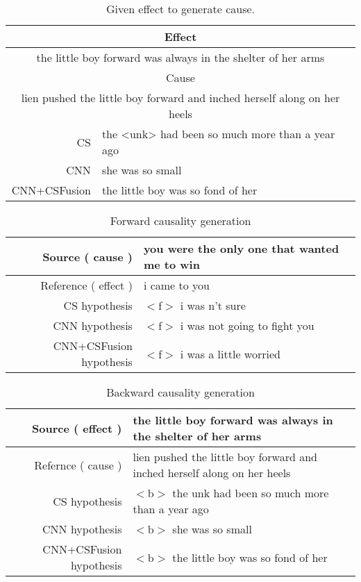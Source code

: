 {\begin{table*}[th]
    \centering
    \small
    \begin{tabular}{|r|l|}%
    \hline
    \multicolumn{2}{|c|}{Effect}\\ 
    \hline
    \multicolumn{2}{|c|}{the little boy forward was always in the shelter of her arms}\\ 
    \hline
    \multicolumn{2}{|c|}{Cause} \\
    \hline
    \multicolumn{2}{|c|}{lien pushed the little boy forward and inched herself along on her heels}\\ 
    \hline
    CS & the <unk> had been so much more than a year ago \\
    \hline
    CNN & she was so small \\
    \hline
    CNN+CSFusion & the little boy was so fond of her \\
    \hline
    \end{tabular}
    \caption{Given effect to generate cause.}
    \label{tab:effect_exp}
\end{table*}
}%

\begin{table*}[th]
    \centering
    \small
    \begin{tabular}{|r|l|}%
    \hline
    Source ( cause ) & you were the only one that wanted me to win \\ 
    \hline
    Reference ( effect ) & i came to you \\ 
    \hline
    CS hypothesis & $<$f$>$ i was n't sure \\
    \hline
    CNN hypothesis & $<$f$>$ i was not going to fight you \\
    \hline
    CNN+CSFusion hypothesis & $<$f$>$ i was a little worried \\
    \hline
    \end{tabular}
    \caption{Forward causality generation}
    \label{tab:cause_exp}
\end{table*}

\begin{table*}[th]
    \centering
    \small
    \begin{tabular}{|r|l|}%
    \hline
    Source ( effect ) & the little boy forward was always in the shelter of her arms \\ 
    \hline
    Refernce ( cause ) & lien pushed the little boy forward and inched herself along on her heels \\ 
    \hline
    CS hypothesis & $<$b$>$ the unk had been so much more than a year ago \\
    \hline
    CNN hypothesis & $<$b$>$ she was so small \\
    \hline
    CNN+CSFusion hypothesis & $<$b$>$ the little boy was so fond of her \\
    \hline
    \end{tabular}
    \caption{Backward causality generation}
    \label{tab:effect_exp}
\end{table*}
